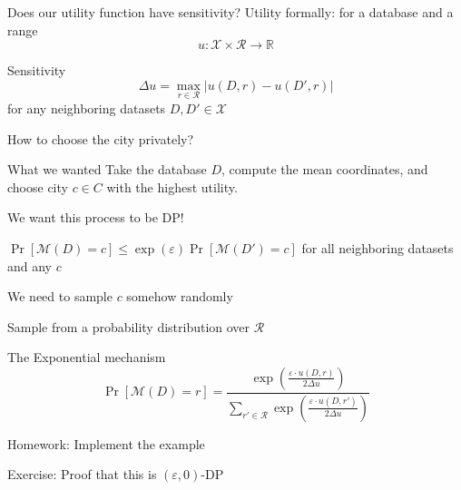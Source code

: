 \documentclass[12pt,aspectratio=169,handout]{beamer}
\begin{document}
\begin{frame}{Does our utility function have sensitivity?}
Utility formally: for a database and a range
$$
u: \mathcal{X} \times \mathcal{R} \to \mathbb{R}
$$

Sensitivity
$$
\Delta u = \max_{r \in \mathcal{R}} |u(D, r) - u(D', r)|
$$
for any neighboring datasets $D, D' \in \mathcal{X}$
\end{frame}

\begin{frame}{How to choose the city privately?}

\begin{block}{What we wanted}
Take the database $D$, compute the mean coordinates, and choose city $c \in C$ with the highest utility.
\end{block}

We want this process to be DP!

$\Pr[\mathcal{M}(D) =c] \leq \exp(\varepsilon) \Pr[\mathcal{M}(D') = c]$ for all neighboring datasets and any $c$

We need to sample $c$ somehow randomly
\end{frame}


\begin{frame}{Sample from a probability distribution over $\mathcal{R}$}

The Exponential mechanism
$$
\Pr [ \mathcal{M}(D) = r] = \frac{\exp \left( \frac{\varepsilon \cdot u(D, r)}{2 \Delta u} \right)}{\sum_{r' \in \mathcal{R}} \exp \left( \frac{\varepsilon \cdot u(D, r')}{2 \Delta u} \right)}
$$

Homework: Implement the example

Exercise: Proof that this is $(\varepsilon, 0)$-DP

\end{frame}
\end{document}
